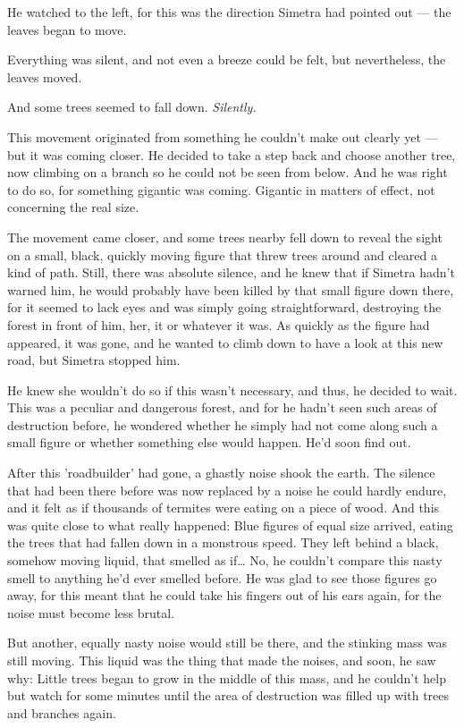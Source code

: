 He watched to the left, for this was the direction Simetra had pointed out --- the leaves began to move.

Everything was silent, and not even a breeze could be felt, but nevertheless, the leaves moved.

And some trees seemed to fall down. \emph{Silently.}

This movement originated from something he couldn't make out clearly yet --- but it was coming closer. He decided to take a step back and choose another tree, now climbing on a branch so he could not be seen from below.  And he was right to do so, for something gigantic was coming. Gigantic in matters of effect, not concerning the real size.

The movement came closer, and some trees nearby fell down to reveal the sight on a small, black, quickly moving figure that threw trees around and cleared a kind of path. Still, there was absolute silence, and he knew that if Simetra hadn't warned him, he would probably have been killed by that small figure down there, for it seemed to lack eyes and was simply going straightforward, destroying the forest in front of him, her, it or whatever it was. As quickly as the figure had appeared, it was gone, and he wanted to climb down to have a look at this new road, but Simetra stopped him.

He knew she wouldn't do so if this wasn't necessary, and thus, he decided to wait. This was a peculiar and dangerous forest, and for he hadn't seen such areas of destruction before, he wondered whether he simply had not come along such a small figure or whether something else would happen. 
He'd soon find out.

After this 'roadbuilder' had gone, a ghastly noise shook the earth. The silence that had been there before was now replaced by a noise he could hardly endure, and it felt as if thousands of termites were eating on a piece of wood. 
And this was quite close to what really happened: Blue figures of equal size arrived, eating the trees that had fallen down in a monstrous speed. They left behind a black, somehow moving liquid, that smelled as if\dots
No, he couldn't compare this nasty smell to anything he'd ever smelled before. He was glad to see those figures go away, for this meant that he could take his fingers out of his ears again, for the noise must become less brutal.

But another, equally nasty noise would still be there, and the stinking mass was still moving. This liquid was the thing that made the noises, and soon, he saw why: Little trees began to grow in the middle of this mass, and he couldn't help but watch for some minutes until the area of destruction was filled up with trees and branches again.

